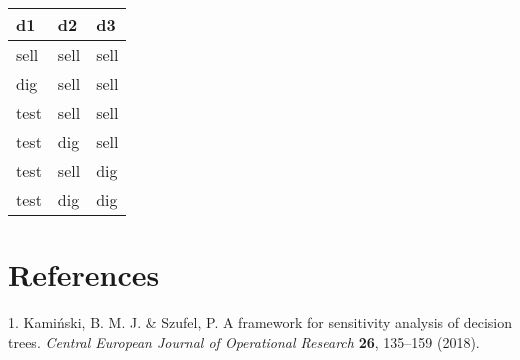 \documentclass[
]{article}
\newenvironment{Shaded}{\begin{snugshade}}{\end{snugshade}}
\newcommand{\CommentTok}[1]{\textcolor[rgb]{0.56,0.35,0.01}{\textit{#1}}}
\newcommand{\DataTypeTok}[1]{\textcolor[rgb]{0.13,0.29,0.53}{#1}}
\newcommand{\DecValTok}[1]{\textcolor[rgb]{0.00,0.00,0.81}{#1}}
\newcommand{\KeywordTok}[1]{\textcolor[rgb]{0.13,0.29,0.53}{\textbf{#1}}}
\newcommand{\NormalTok}[1]{#1}
\newcommand{\OperatorTok}[1]{\textcolor[rgb]{0.81,0.36,0.00}{\textbf{#1}}}
\newcommand{\StringTok}[1]{\textcolor[rgb]{0.31,0.60,0.02}{#1}}
\begin{document}
\begin{longtable}[]{@{}lll@{}}
\toprule
d1 & d2 & d3\tabularnewline
\midrule
\endhead
sell & sell & sell\tabularnewline
dig & sell & sell\tabularnewline
test & sell & sell\tabularnewline
test & dig & sell\tabularnewline
test & sell & dig\tabularnewline
test & dig & dig\tabularnewline
\bottomrule
\end{longtable}

\begin{Shaded}
\end{Shaded}

\hypertarget{references}{%
\section*{References}\label{references}}

\hypertarget{refs}{}
\leavevmode\hypertarget{ref-kaminski:2018a}{}%
1. Kamiński, B. M. J. \& Szufel, P. A framework for sensitivity analysis
of decision trees. \emph{Central European Journal of Operational
Research} \textbf{26}, 135--159 (2018).
\end{document}
